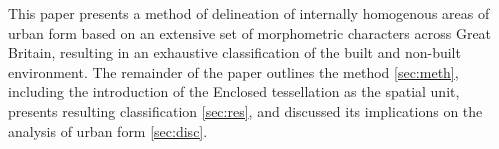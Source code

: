 This paper presents a method of delineation of internally homogenous areas of urban form
based on an extensive set of morphometric characters across Great Britain, resulting
in an exhaustive classification of the built and non-built environment. The remainder of
the paper outlines the method \ref{sec:meth}, including the introduction of the Enclosed
tessellation as the spatial unit, presents resulting classification \ref{sec:res}, and
discussed its implications on the analysis of urban form \ref{sec:disc}.